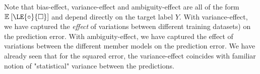 \documentclass[../main.tex]{subfiles}
\begin{document}


Note that bias-effect, variance-effect and ambiguity-effect are all of the form $\mathbb{E}_{}\left[ \LE{\circ}{\square} \right]$ and depend directly on the target label $Y$. 
With variance-effect, we have captured the \textit{effect} of variations between different training datasets) on the prediction error.
With ambiguity-effect, we have captured the effect of variations between the different member models on the prediction error.
We have already seen that for the squared error, the variance-effect coincides with familiar notion of "statistical" variance between the predictions.

\end{document}
